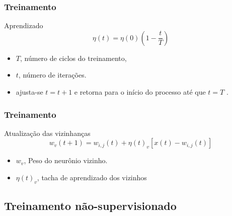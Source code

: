 \documentclass[10pt]{beamer} %
\begin{document}
\begin{frame}
	\frametitle{Treinamento}
	\begin{block}{Aprendizado}
		\begin{equation}
		\eta(t)=\eta(0)    ( 1 -  \frac{t}{T}  )  \nonumber
		\label{aprendizado}
		\end{equation}
	\end{block}
	\begin{itemize}
		\pause
		\item $T$, número de ciclos do treinamento,
		\pause
		\item $t$, número de iterações.
		\pause
		\item ajusta-se $t=t+1$ e retorna para o início do processo até que $t=T$ \citep{YANG2009,Yan2014}.
	\end{itemize}
\end{frame}

\begin{frame}
	\frametitle{Treinamento}
	\begin{block}{Atualização das vizinhanças}
		\begin{equation}
		w_{v}(t+1)=w_{i,j}(t)+\eta(t)_{v}[x(t)-w_{i,j}(t)] \nonumber
		\label{ajuste de pesos}
		\end{equation}
	\end{block}
	\begin{itemize}
		\pause
		\item $w_{v}$, Peso do neurônio vizinho. %
		\pause
		\item $\eta(t)_{v}$, tacha de aprendizado dos vizinhos%
		\pause
	\end{itemize}
\end{frame}

\subsection{Treinamento não-supervisionado}
\end{document}
